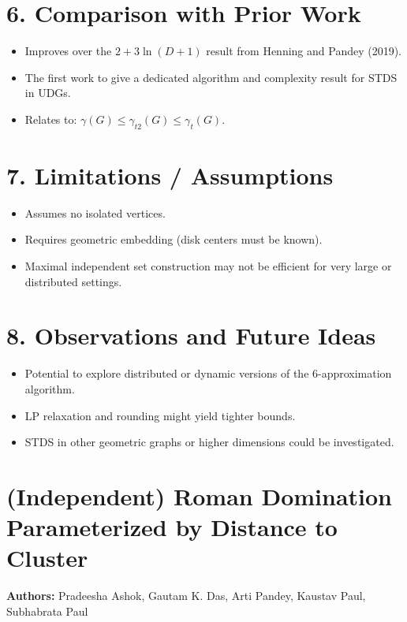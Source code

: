 \documentclass{article}
\begin{document}
\vspace{1em}

\section*{6. Comparison with Prior Work}
\begin{itemize}[leftmargin=1.5em]
    \item Improves over the \( 2 + 3 \ln(D+1) \) result from Henning and Pandey (2019).
    \item The first work to give a dedicated algorithm and complexity result for STDS in UDGs.
    \item Relates to: \( \gamma(G) \leq \gamma_{t2}(G) \leq \gamma_t(G) \).
\end{itemize}

\section*{7. Limitations / Assumptions}
\begin{itemize}[leftmargin=1.5em]
    \item Assumes no isolated vertices.
    \item Requires geometric embedding (disk centers must be known).
    \item Maximal independent set construction may not be efficient for very large or distributed settings.
\end{itemize}

\section*{8. Observations and Future Ideas}
\begin{itemize}[leftmargin=1.5em]
    \item Potential to explore distributed or dynamic versions of the 6-approximation algorithm.
    \item LP relaxation and rounding might yield tighter bounds.
    \item STDS in other geometric graphs or higher dimensions could be investigated.
\end{itemize}

\section*{(Independent) Roman Domination Parameterized by Distance to Cluster}

\textbf{Authors:} Pradeesha Ashok, Gautam K. Das, Arti Pandey, Kaustav Paul, Subhabrata Paul
\end{document}
